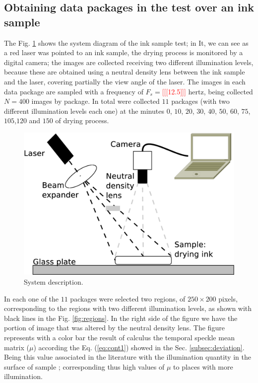 \documentclass[review]{elsarticle}
\begin{document}
\subsection{Obtaining data packages in the test over an ink sample}
\label{sec:descriptionink}
The Fig. \ref{fig:system} shows the system diagram of the ink sample test; in It, we can see as
a red laser was pointed to an ink sample, the drying process is monitored by a digital camera;
the images are collected receiving two different illumination levels, because these 
are obtained using a neutral 
density lens between the ink sample and the laser, covering partially the view angle of the laser.
The images in each data package
are sampled with a frequency of $F_s=$\textcolor{red}{[[[12.5]]]} hertz, being 
collected $N=400$ images by package. In total were collected $11$ packages 
(with two different illumination levels each one) at the minutes 
$0$, $10$, $20$, $30$, $40$, $50$, $60$, $75$,$105$,$120$ and $150$ of drying process. 
\begin{figure}[ht!]
\centering
\includegraphics[width=0.65\columnwidth]{system.eps}
\caption{System description.}
\label{fig:system}
\end{figure}
In each one of the $11$ packages were selected two regions, of $250\times200$ pixels, 
corresponding to the regions with two different illumination levels, 
as shown with black lines in the Fig. \ref{fig:regions}. In the right side of the figure  we have the
portion of image that was altered by the neutral density lens. The figure represents
with a color bar the result of  calculus the temporal speckle mean matrix ($\mu$) according the Eq. (\ref{eq:cont1})
showed in the Sec. \ref{subsec:deviation}. Being this value associated in the literature with
the illumination quantity in the surface of sample \cite{Nothdurft:05}; corresponding thus high values of $\mu$
to places with more illumination. 
\end{document}
